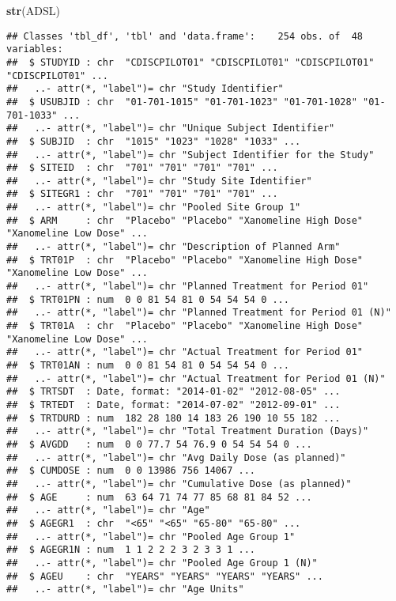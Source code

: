 \documentclass[]{book}
\newenvironment{Shaded}{\begin{snugshade}}{\end{snugshade}}
\newcommand{\KeywordTok}[1]{\textcolor[rgb]{0.13,0.29,0.53}{\textbf{#1}}}
\newcommand{\NormalTok}[1]{#1}
\begin{document}
\begin{Shaded}
\begin{Highlighting}[]
\KeywordTok{str}\NormalTok{(ADSL)}
\end{Highlighting}
\end{Shaded}

\begin{verbatim}
## Classes 'tbl_df', 'tbl' and 'data.frame':    254 obs. of  48 variables:
##  $ STUDYID : chr  "CDISCPILOT01" "CDISCPILOT01" "CDISCPILOT01" "CDISCPILOT01" ...
##   ..- attr(*, "label")= chr "Study Identifier"
##  $ USUBJID : chr  "01-701-1015" "01-701-1023" "01-701-1028" "01-701-1033" ...
##   ..- attr(*, "label")= chr "Unique Subject Identifier"
##  $ SUBJID  : chr  "1015" "1023" "1028" "1033" ...
##   ..- attr(*, "label")= chr "Subject Identifier for the Study"
##  $ SITEID  : chr  "701" "701" "701" "701" ...
##   ..- attr(*, "label")= chr "Study Site Identifier"
##  $ SITEGR1 : chr  "701" "701" "701" "701" ...
##   ..- attr(*, "label")= chr "Pooled Site Group 1"
##  $ ARM     : chr  "Placebo" "Placebo" "Xanomeline High Dose" "Xanomeline Low Dose" ...
##   ..- attr(*, "label")= chr "Description of Planned Arm"
##  $ TRT01P  : chr  "Placebo" "Placebo" "Xanomeline High Dose" "Xanomeline Low Dose" ...
##   ..- attr(*, "label")= chr "Planned Treatment for Period 01"
##  $ TRT01PN : num  0 0 81 54 81 0 54 54 54 0 ...
##   ..- attr(*, "label")= chr "Planned Treatment for Period 01 (N)"
##  $ TRT01A  : chr  "Placebo" "Placebo" "Xanomeline High Dose" "Xanomeline Low Dose" ...
##   ..- attr(*, "label")= chr "Actual Treatment for Period 01"
##  $ TRT01AN : num  0 0 81 54 81 0 54 54 54 0 ...
##   ..- attr(*, "label")= chr "Actual Treatment for Period 01 (N)"
##  $ TRTSDT  : Date, format: "2014-01-02" "2012-08-05" ...
##  $ TRTEDT  : Date, format: "2014-07-02" "2012-09-01" ...
##  $ TRTDURD : num  182 28 180 14 183 26 190 10 55 182 ...
##   ..- attr(*, "label")= chr "Total Treatment Duration (Days)"
##  $ AVGDD   : num  0 0 77.7 54 76.9 0 54 54 54 0 ...
##   ..- attr(*, "label")= chr "Avg Daily Dose (as planned)"
##  $ CUMDOSE : num  0 0 13986 756 14067 ...
##   ..- attr(*, "label")= chr "Cumulative Dose (as planned)"
##  $ AGE     : num  63 64 71 74 77 85 68 81 84 52 ...
##   ..- attr(*, "label")= chr "Age"
##  $ AGEGR1  : chr  "<65" "<65" "65-80" "65-80" ...
##   ..- attr(*, "label")= chr "Pooled Age Group 1"
##  $ AGEGR1N : num  1 1 2 2 2 3 2 3 3 1 ...
##   ..- attr(*, "label")= chr "Pooled Age Group 1 (N)"
##  $ AGEU    : chr  "YEARS" "YEARS" "YEARS" "YEARS" ...
##   ..- attr(*, "label")= chr "Age Units"

\end{verbatim}
\end{document}

